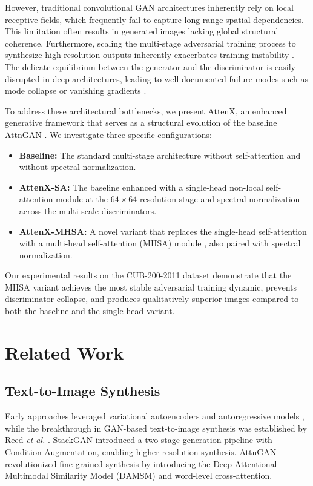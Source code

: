 \documentclass[conference]{IEEEtran}
\begin{document}
However, traditional convolutional GAN architectures inherently rely on local receptive fields, which frequently fail to capture long-range spatial dependencies. This limitation often results in generated images lacking global structural coherence. Furthermore, scaling the multi-stage adversarial training process to synthesize high-resolution outputs inherently exacerbates training instability \cite{salimans2016improved}. The delicate equilibrium between the generator and the discriminator is easily disrupted in deep architectures, leading to well-documented failure modes such as mode collapse or vanishing gradients \cite{arjovsky2017wasserstein}.

To address these architectural bottlenecks, we present AttenX, an enhanced generative framework that serves as a structural evolution of the baseline AttnGAN \cite{xu2018attngan}. We investigate three specific configurations:

\begin{itemize}
    \item \textbf{Baseline:} The standard multi-stage architecture without self-attention and without spectral normalization.
    \item \textbf{AttenX-SA:} The baseline enhanced with a single-head non-local self-attention module at the $64 \times 64$ resolution stage and spectral normalization across the multi-scale discriminators.
    \item \textbf{AttenX-MHSA:} A novel variant that replaces the single-head self-attention with a multi-head self-attention (MHSA) module \cite{vaswani2017attention}, also paired with spectral normalization.
\end{itemize}

Our experimental results on the CUB-200-2011 dataset \cite{wah2011caltech} demonstrate that the MHSA variant achieves the most stable adversarial training dynamic, prevents discriminator collapse, and produces qualitatively superior images compared to both the baseline and the single-head variant.

\section{Related Work}

\subsection{Text-to-Image Synthesis}
Early approaches leveraged variational autoencoders and autoregressive models \cite{van2016conditional}, while the breakthrough in GAN-based text-to-image synthesis was established by Reed \textit{et al.} \cite{reed2016generative}. StackGAN \cite{zhang2017stackgan} introduced a two-stage generation pipeline with Condition Augmentation, enabling higher-resolution synthesis. AttnGAN \cite{xu2018attngan} revolutionized fine-grained synthesis by introducing the Deep Attentional Multimodal Similarity Model (DAMSM) and word-level cross-attention.
\end{document}
